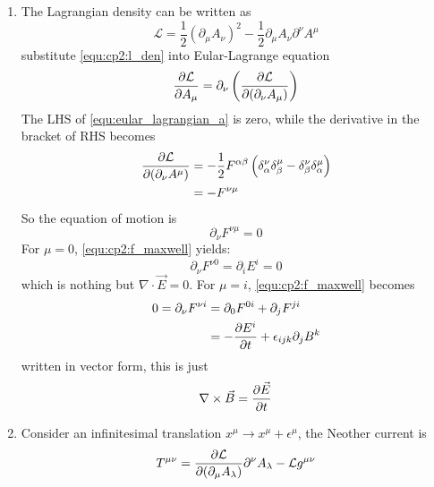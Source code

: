\solution 
\begin{enumerate}[label = {(\alph*)}]
    \item The Lagrangian density can be written as
    \begin{equation}\label{equ:cp2:l_den}
        \mathcal{L} = \frac{1}{2} \left(\partial_\mu A_\nu\right)^2 - \frac{1}{2}\partial_\mu A_\nu \partial^\nu A^\mu
    \end{equation}
    substitute \eqref{equ:cp2:l_den} into Eular-Lagrange equation
    \begin{equation}\label{equ:eular_lagrangian_a}
        \frac{\partial \mathcal{L}}{\partial A_\mu} = \partial_\nu \left(\frac{\partial \mathcal{L}}{\partial (\partial_\nu A_\mu)}\right)
    \end{equation}
    The LHS of \eqref{equ:eular_lagrangian_a} is zero, while the derivative in the bracket of RHS becomes
    \begin{align*}
        \frac{\partial \mathcal{L}}{\partial (\partial_\nu A^\mu)} 
        & = -\frac{1}{2} F^{\alpha\beta} \left(\delta^\nu_\alpha \delta^\mu_\beta - \delta^\nu_\beta \delta^\mu_\alpha\right)\\
        & = -F^{\nu\mu}
    \end{align*}
    So the equation of motion is
    \begin{equation}\label{equ:cp2:f_maxwell}
        \partial_\nu F^{\nu\mu} = 0
    \end{equation}
    For $\mu = 0$, \eqref{equ:cp2:f_maxwell} yields:
    \begin{equation*}
        \partial_\nu F^{\nu 0} = \partial_i E^i = 0
    \end{equation*}
    which is nothing but $\nabla\cdot\vec{E} = 0$. For $\mu = i$, \eqref{equ:cp2:f_maxwell} becomes
    \begin{align*}
        0 = \partial_\nu F^{\nu i} 
        & = \partial_0 F^{0i} + \partial_j F^{ji}\\
        & = -\frac{\partial E^i}{\partial t} + \epsilon_{ijk}\partial_j B^k
    \end{align*}
    written in vector form, this is just
    \begin{equation*}
        \nabla\times\vec{B} = \frac{\partial \vec{E}}{\partial t}
    \end{equation*}
    \item Consider an infinitesimal translation $x^\mu \to x^\mu + \epsilon^\mu$, the Neother current 
    is 
    \begin{equation}\label{equ:cp2:a_neother}
        T^{\mu\nu} = \pd{\mathcal{L}}{(\partial_\mu A_\lambda)} \partial^\nu A_\lambda - \mathcal{L} g^{\mu\nu}

\end{equation}
\end{enumerate}
